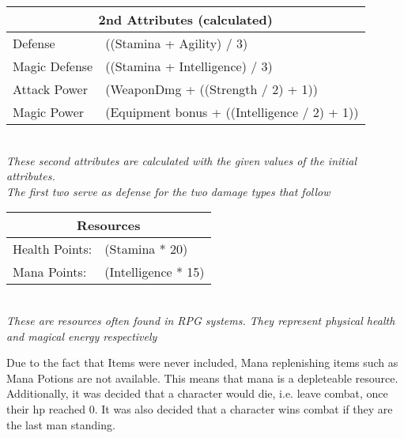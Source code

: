 \begin{center}
\begin{tabular}{|l l|}
\hline
\multicolumn{2}{|c|}{\textbf{2nd Attributes (calculated)}}\\
\hline
Defense & ((Stamina + Agility) / 3)\\
\hline
Magic Defense & ((Stamina + Intelligence) / 3)\\
\hline
Attack Power & (WeaponDmg + ((Strength / 2) + 1))\\
\hline
Magic Power & (Equipment bonus + ((Intelligence / 2) + 1))\\
\hline
\end{tabular}\\
\emph{These second attributes are calculated with the given values of the initial attributes.\\ The first two serve as defense for the two damage types that follow}
\end{center}
\begin{comment}
\begin{center}
\begin{tabular}{|l l|}
\hline
\multicolumn{2}{|c|}{\textbf{3rd Attributes}}\\
\hline
Attack Power & (WeaponDmg + ((Strength / 2) + 1))\\
\hline
Magic Power & (Equipment bonus + ((Intelligence / 2) + 1))\\
\hline
\end{tabular}\\
\emph{These values are calculated from the manually set attributes and calculate damage.}
\end{center}
\end{comment}
\begin{center}
\begin{tabular}{|l l|}
\hline
\multicolumn{2}{|c|}{\textbf{Resources}}\\
\hline
Health Points: & (Stamina * 20)\\
\hline
Mana Points: & (Intelligence * 15)\\
\hline
\end{tabular}\\
\emph{These are resources often found in RPG systems. They represent physical health and magical energy respectively}
\end{center}

Due to the fact that Items were never included, Mana replenishing items such as Mana Potions are not available. This means that mana is a depleteable resource.
Additionally, it was decided that a character would die, i.e. leave combat, once their \ac{hp} reached 0.  It was also decided that a character wins combat if they are the last man standing.